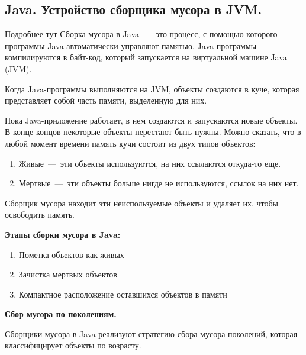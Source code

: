 \subsection{Java. Устройство сборщика мусора в JVM.}

\href{https://medium.com/nuances-of-programming/%D1%81%D0%B1%D0%BE%D1%80%D0%BA%D0%B0-%D0%BC%D1%83%D1%81%D0%BE%D1%80%D0%B0-%D0%B2-java-%D1%87%D1%82%D0%BE-%D1%8D%D1%82%D0%BE-%D1%82%D0%B0%D0%BA%D0%BE%D0%B5-%D0%B8-%D0%BA%D0%B0%D0%BA-%D1%80%D0%B0%D0%B1%D0%BE%D1%82%D0%B0%D0%B5%D1%82-%D0%B2-jvm-25bb2570b44c}{Подробнее тут}
Сборка мусора в Java~---~это процесс, с помощью которого программы Java автоматически управляют памятью. Java-программы компилируются в байт-код, который запускается на виртуальной машине Java (JVM).

Когда Java-программы выполняются на JVM, объекты создаются в куче, которая представляет собой часть памяти, выделенную для них.

Пока Java-приложение работает, в нем создаются и запускаются новые объекты. В конце концов некоторые объекты перестают быть нужны. Можно сказать, что в любой момент времени память кучи состоит из двух типов объектов:
\begin{enumerate}
	\item Живые~---~эти объекты используются, на них ссылаются откуда-то еще.
	\item Мертвые~---~эти объекты больше нигде не используются, ссылок на них нет.
\end{enumerate}

Сборщик мусора находит эти неиспользуемые объекты и удаляет их, чтобы освободить память.

\textbf{Этапы сборки мусора в Java:}
\begin{enumerate}
	\item Пометка объектов как живых
	\item Зачистка мертвых объектов
	\item Компактное расположение оставшихся объектов в памяти
\end{enumerate} 

\textbf{Сбор мусора по поколениям.}

Сборщики мусора в Java реализуют стратегию сбора мусора поколений, которая классифицирует объекты по возрасту.

